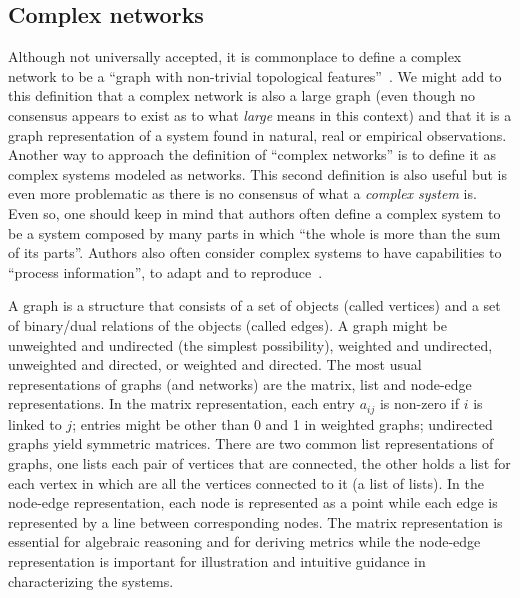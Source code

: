 \subsection{Complex networks}
Although not universally accepted, it is commonplace to define a complex network to be
a ``graph with non-trivial topological features''~\cite{newmanBook}.
We might add to this definition that a complex network is also a large graph (even though no consensus appears to exist as 
to what \emph{large} means in this context)
and that it is a graph representation of a system found in natural, real or empirical observations.
Another way to approach the definition of ``complex networks'' is to define it as
complex systems modeled as networks.
This second definition is also useful but is even more problematic as
there is no consensus of what a \emph{complex system} is.
Even so, one should keep in mind that authors often define a complex system
to be a system composed by many parts in which ``the whole is more than
the sum of its parts''.
Authors also often consider complex systems to have capabilities
to ``process information'', to adapt and to reproduce~\cite{complexity}.

A graph is a structure that consists of a set of objects (called vertices)
and a set of binary/dual relations of the objects (called edges).
A graph might be unweighted and undirected (the simplest possibility),
weighted and undirected, unweighted and directed, or weighted and directed. The most usual representations of graphs (and networks) are the matrix, list and node-edge representations.
In the matrix representation, each entry $a_{ij}$ is non-zero if $i$ is linked to $j$;
entries might be other than 0 and 1 in weighted graphs; undirected graphs yield symmetric matrices.
There are two common list representations of graphs, one lists each pair of vertices that are connected,
the other holds a list for each vertex in which are all the vertices connected to it (a list of lists).
In the node-edge representation, each node is represented as a point while each edge is represented
by a line between corresponding nodes.
The matrix representation is essential for algebraic reasoning and for deriving metrics
while the node-edge representation is important for illustration and intuitive guidance
in characterizing the systems.

